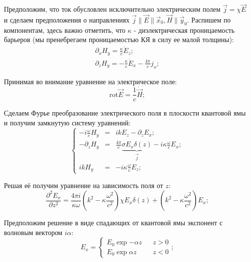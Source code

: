 \documentclass[../main.tex]{subfiles}
\newcommand{\rot}{\text{rot}}
\begin{document}
    Предположим, что ток обусловлен исключительно электрическим полем
    $\vec j  = \chi \vec E$ и сделаем предположения о направлениях 
    $\vec j \parallel \vec E \parallel \vec{x}_0, \vec H \parallel \vec{y}_0$.
    Распишем по компонентам, здесь важно отметить, что $\kappa$ 
    - диэлектрическая проницаемость барьеров (мы пренебрегаем проницаемостью
    КЯ в силу ее малой толщины):
    \begin{equation}
        \begin{aligned}
            \partial_x H_y = \frac{\kappa}{c} \dot{E}_z; \\
            \partial_z H_y = - \frac{\kappa}{c} \dot{E}_x - \frac{4\pi}{c} j_x;
        \end{aligned}
    \end{equation}

    Принимая во внимание уравнение на электрическое поле:
    \begin{equation}
        \rot \vec E = \frac{1}{c} \dot{\vec H};
    \end{equation}

    Сделаем Фурье преобразование электрического поля в плоскости квантовой ямы
    и получим замкнутую систему уравнений:
    \begin{equation}
        \left\{
        \begin{aligned}
            - i \frac{\omega}{c} H_y &=& i k E_z - \partial_z E_x;\\
            - \partial_z H_y  &=& \frac{4\pi}{c} \underbrace{\sigma E_x
            \delta(z)}_{\vec j} 
            - i \kappa \frac{\omega}{c} E_x;\\
            ik H_y  &=& - i \kappa \frac{\omega}{c} E_z;
        \end{aligned}
        \right.
    \end{equation}

    Решая её получим уравнение на зависимость поля от $z$:
    \begin{equation}
        \frac{\partial^2 E_x}{\partial z^2} = \frac{4\pi i}{\kappa \omega}
        \left(k^2  - \kappa \frac{\omega^2}{c^2}\right) \chi E_x \delta(z)
        + \left(k^2  - \kappa \frac{\omega^2}{c^2}\right) E_x;
    \end{equation}

    Предположим решение в виде спадающих от квантовой ямы экспонент
    с волновым вектором $i\alpha$:
    \begin{equation*}
        E_x = \left\{
            \begin{aligned}
                E_0 \exp{-\alpha z} & &z > 0\\
                E_0 \exp{\alpha z} & &z < 0
            \end{aligned}
        \right.;
    \end{equation*}
\end{document}
